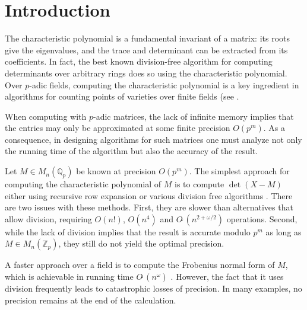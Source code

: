 \documentclass{sig-alternate-05-2015}
\newcommand{\Z}{\mathbb Z}
\newcommand{\Zp}{\Z_p}
\newcommand{\Q}{\mathbb Q}
\newcommand{\Qp}{\Q_p}
\newcommand{\softO}{O\tilde{~}}
\def\todo#1{\ \!\!{\color{red} #1}}
\begin{document}
%
%

\section{Introduction}

The characteristic polynomial is a fundamental invariant of a matrix: its roots
give the eigenvalues, and the trace and determinant can be extracted from its coefficients.
In fact, the best known division-free algorithm for computing determinants
over arbitrary rings \cite{kaltofen:92a} does so using the characteristic polynomial.
Over $p$-adic fields, computing the characteristic polynomial is a key ingredient in
algorithms for counting points of varieties over finite fields (see
\cite{kedlaya:01a, harvey:07a, harvey:14a}.


When computing with $p$-adic matrices, the lack of infinite memory implies
that the entries may only be approximated at some finite precision $O(p^m)$.  As a
consequence, in designing algorithms for such matrices one must analyze
not only the running time of the algorithm but also the accuracy of the result.

Let $M \in M_n(\Qp)$ be known at precision $O(p^m)$.
The simplest approach for computing the characteristic polynomial of $M$
is to compute $\det(X-M)$ either using recursive row expansion or various division free
algorithms .  There are two issues
with these methods.  First, they are slower than alternatives that allow division,
requiring $O(n!)$, $O(n^4)$ and $\softO(n^{2 + \omega/2})$ operations.  Second,
while the lack of division implies that the result is accurate modulo $p^m$ as
long as $M \in M_n(\Zp)$, they still do not yield the optimal precision.

A faster approach over a field is to compute the Frobenius normal form of $M$,
which is achievable in running time $\softO(n^\omega)$ \cite{storjohann:01a}.
However, the fact that it uses division frequently leads to catastrophic losses of precision.
In many examples, no precision remains at the end of the calculation.
\end{document}
